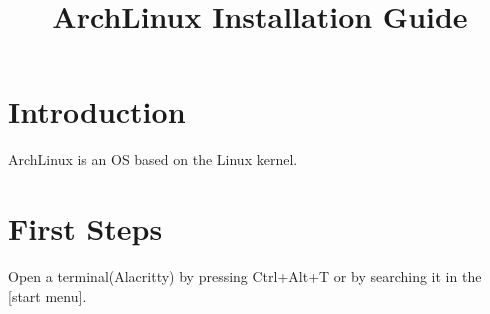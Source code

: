 \documentclass{article}
\title{ArchLinux Installation Guide}
\date{}
\begin{document}
\maketitle
\newpage
\section{Introduction}
ArchLinux is an OS based on the Linux kernel.
\section{First Steps}
Open a terminal(Alacritty) by pressing Ctrl+Alt+T or by searching it in the [start menu].
\end{document}
